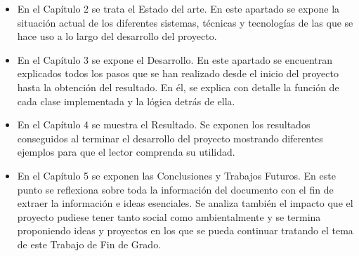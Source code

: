 \documentclass[../main.tex]{subfiles}
\begin{document}
\begin{itemize}
    \item En el Capítulo 2 se trata el Estado del arte. En este apartado se expone la situación actual de los diferentes sistemas, técnicas y tecnologías de las que se hace uso a lo largo del desarrollo del proyecto.
    \item En el Capítulo 3 se expone el Desarrollo. En este apartado se encuentran explicados todos los pasos que se han realizado desde el inicio del proyecto hasta la obtención del resultado. En él, se explica con detalle la función de cada clase implementada y la lógica detrás de ella.
    \item En el Capítulo 4 se muestra el Resultado. Se exponen los resultados conseguidos al terminar el desarrollo del proyecto mostrando diferentes ejemplos para que el lector comprenda su utilidad.
    \item En el Capítulo 5 se exponen las Conclusiones y Trabajos Futuros. En este punto se reflexiona sobre toda la información del documento con el fin de extraer la información e ideas esenciales. Se analiza también el impacto que el proyecto pudiese tener tanto social como ambientalmente y se termina proponiendo ideas y proyectos en los que se pueda continuar tratando el tema de este Trabajo de Fin de Grado.
\end{itemize}
\end{document}

